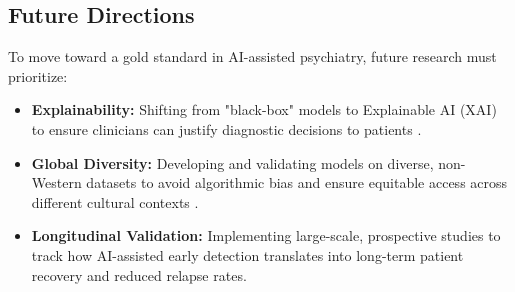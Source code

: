 \documentclass[12pt]{article}
\begin{document}
\subsection{Future Directions}
To move toward a gold standard in AI-assisted psychiatry, future research must prioritize:
\begin{itemize}
    \item \textbf{Explainability:} Shifting from "black-box" models to Explainable AI (XAI) to ensure clinicians can justify diagnostic decisions to patients \citep{weber2025}.
    \item \textbf{Global Diversity:} Developing and validating models on diverse, non-Western datasets to avoid algorithmic bias and ensure equitable access across different cultural contexts \citep{kohrt2025, ricci2025}.
    \item \textbf{Longitudinal Validation:} Implementing large-scale, prospective studies to track how AI-assisted early detection translates into long-term patient recovery and reduced relapse rates.
\end{itemize}


\newpage


\end{document}
